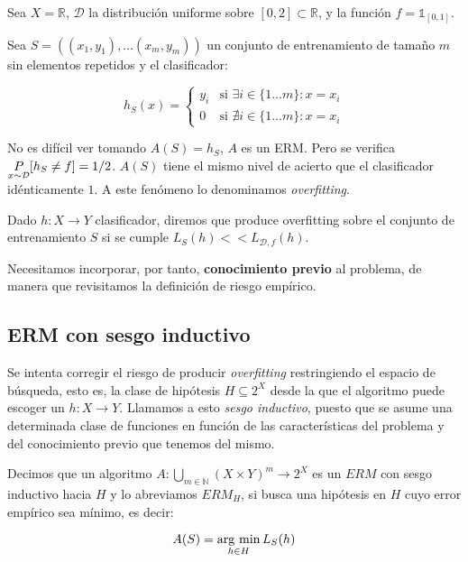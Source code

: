 \begin{example}
Sea $X = \mathbb{R}$, $\mathcal{D}$ la distribución uniforme sobre $[0,2]\subset \mathbb{R}$, y la función
$f= \mathds{1}_{[0,1]}$.


Sea $S = ((x_1,y_1), \ldots (x_m, y_m))$ un conjunto de entrenamiento de tamaño $m$ sin elementos repetidos 
y el clasificador:

\[h_S(x) = \left\{\begin{array}{ll}
y_i & \textrm{si } \exists i\in \{1\ldots m\} : x=x_i\\
0   & \textrm{si } \nexists i\in \{1\ldots m\} : x=x_i
\end{array}\right.\]

No es difícil ver tomando $A(S) = h_S$, $A$ es un ERM. Pero se verifica $\underset{x\sim \mathcal{D}}{P}[h_S \neq f] = 1/2$. $A(S)$ tiene el 
mismo nivel de acierto que el clasificador idénticamente $1$. A este fenómeno lo denominamos \textit{overfitting}.
\end{example}

\begin{definition}[Overfitting]

 Dado $h: X\rightarrow Y$ clasificador, diremos que produce overfitting sobre el conjunto de entrenamiento 
 $S$ si se cumple $L_S(h) << L_{\mathcal{D},f}(h)$.
\end{definition}

Necesitamos incorporar, por tanto, \textbf{conocimiento previo} al problema, de manera que revisitamos la definición de riesgo
empírico.

\subsection{ERM con sesgo inductivo}
Se intenta corregir el riesgo de producir \emph{overfitting} restringiendo el espacio de búsqueda, esto es, la clase de 
hipótesis $H \subseteq 2^X$ desde la que el algoritmo puede escoger un $h: X\rightarrow Y$. Llamamos a esto 
\emph{sesgo inductivo}, puesto que se asume una determinada clase de funciones en función de las 
características del problema y del conocimiento previo que tenemos del mismo.

\begin{definition}
Decimos que un algoritmo $A: \underset{m\in \mathbb{N}}{\bigcup} (X\times Y)^m \rightarrow 2^{X}$ es un $ERM$ con sesgo 
inductivo hacia $H$ y lo abreviamos $ERM_H$, si busca una hipótesis en $H$ cuyo error empírico 
sea mínimo, es decir:

\[A(S) = \operatorname*{arg\,\min}_{h\in H} L_S(h)\]
\end{definition}

